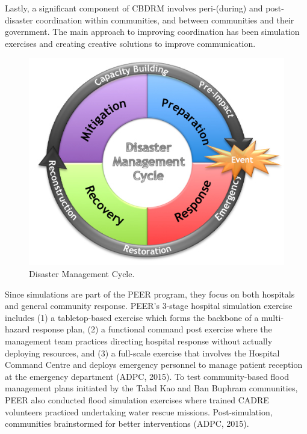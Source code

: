 Lastly, a significant component of CBDRM involves peri-(during) and post-disaster coordination within communities, and between communities and their government. The main approach to improving coordination has been simulation exercises and creating creative solutions to improve communication.

\begin{figure}[htb]
	\centering
		\includegraphics[width=1.00\textwidth]{graphics/Disaster_Capacity_Building.jpg}
	\caption{Disaster Management Cycle.  }
	\label{fig:Disaster_Capacity_Building}
\end{figure}

Since simulations are part of the PEER program, they focus on both hospitals and general community response. PEER’s 3-stage hospital simulation exercise includes (1) a tabletop-based exercise which forms the backbone of a multi-hazard response plan, (2) a functional command post exercise where the management team practices directing hospital response without actually deploying resources, and (3) a full-scale exercise that involves the Hospital Command Centre and deploys emergency personnel to manage patient reception at the emergency department (ADPC, 2015). To test community-based flood management plans initiated by the Talad Kao and Ban Buphram communities, PEER also conducted flood simulation exercises where trained CADRE volunteers practiced undertaking water rescue missions. Post-simulation, communities brainstormed for better interventions (ADPC, 2015).

